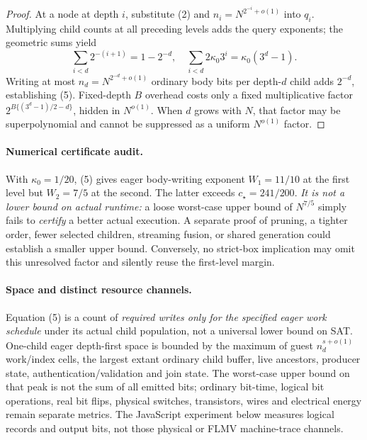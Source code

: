 \documentclass[11pt]{article}
\begin{document}
\begin{proof}
At a node at depth $i$, substitute (2) and
$n_i=N^{2^{-i}+o(1)}$ into $q_i$.
Multiplying child counts at all preceding levels adds
the query exponents; the geometric sums yield
\[
 \sum_{i<d}2^{-(i+1)}=1-2^{-d},\quad
 \sum_{i<d}2\kappa_0 3^i=\kappa_0(3^d-1).
\]
Writing at most $n_d=N^{2^{-d}+o(1)}$ ordinary
body bits per depth-$d$ child adds $2^{-d}$,
establishing (5).  Fixed-depth $B$ overhead costs only
a fixed multiplicative factor
$2^{B\{(3^d-1)/2-d\}}$, hidden in $N^{o(1)}$.
When $d$ grows with $N$, that factor may be
superpolynomial and cannot be suppressed as a
uniform $N^{o(1)}$ factor.
\end{proof}

\paragraph{Numerical certificate audit.}
With $\kappa_0=1/20$, (5) gives eager body-writing
exponent $W_1=11/10$ at the first level but
$W_2=7/5$ at the second.
The latter exceeds $c_\star=241/200$.
\emph{It is not a lower bound on actual runtime:}
a loose worst-case upper bound of $N^{7/5}$ simply
fails to \emph{certify} a better actual execution.
A separate proof of pruning, a tighter order, fewer
selected children, streaming fusion, or shared generation
could establish a smaller upper bound.
Conversely, no strict-box implication may omit this
unresolved factor and silently reuse the first-level margin.

\paragraph{Space and distinct resource channels.}
Equation (5) is a count of \emph{required writes only for the
specified eager work schedule} under its actual child
population, not a universal lower bound on SAT.
One-child eager depth-first space is bounded by the
maximum of guest $n_d^{s+o(1)}$ work/index cells,
the largest extant ordinary child buffer, live ancestors,
producer state, authentication/validation and join state.
The worst-case upper bound on that peak is not the sum
of all emitted bits; ordinary bit-time, logical bit
operations, real bit flips, physical switches,
transistors, wires and electrical energy remain
separate metrics.  The JavaScript experiment below
measures logical records and output bits, not those
physical or FLMV machine-trace channels.
\end{document}
